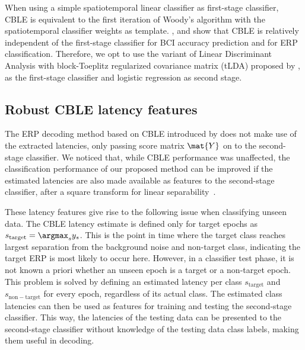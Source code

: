 When using a simple spatiotemporal linear classifier as first-stage classifier,
CBLE is equivalent to the first iteration of Woody's algorithm with the
spatiotemporal classifier weights as template.
\cite{Thompson2012}, \cite{Mowla2017} and \cite{Mowla2020} show
that CBLE is relatively independent of the first-stage classifier for BCI
accuracy prediction and for ERP classification.
Therefore, we opt to use the variant of Linear Discriminant Analysis with block-Toeplitz
regularized covariance matrix (tLDA) proposed by \cite{Sosulski2022}, as the first-stage
classifier and logistic regression as second stage.

\subsection{Robust CBLE latency features}
\label{sec:robust-latency}
The ERP decoding method based on CBLE introduced by \cite{Mowla2017} does
not make use of the extracted latencies, only passing score matrix $\mat{Y}$ on
to the second-stage classifier.
We noticed that, while CBLE performance was unaffected, the classification
performance of our proposed method can be improved if the estimated
latencies are also made available as features to the second-stage classifier,
after a square transform for linear separability~\cite{Thompson2012}.

These latency features give rise to the following issue when
classifying unseen data.
The CBLE latency estimate is defined only for target epochs as
$s_\mathrm{target}=\argmax_s{y_s}$.
This is the point in time where the target class reaches largest separation
from the background noise and non-target class, indicating the target ERP is
most likely to occur here.
However, in a classifier test phase, it is not known a priori whether an
unseen epoch is a target or a non-target epoch.
This problem is solved by defining an estimated latency per class
$s_\mathrm{target}$ and $s_\mathrm{non-target}$ for every epoch,
regardless of its actual class.
The estimated class latencies can then be used as features  for training and
testing the second-stage classifier.
This way, the latencies of the testing data can be presented to the second-stage
classifier without knowledge of the testing data class labels, making them
useful in decoding.

